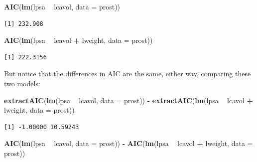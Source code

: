 \documentclass[]{book}
\newenvironment{Shaded}{\begin{snugshade}}{\end{snugshade}}
\newcommand{\KeywordTok}[1]{\textcolor[rgb]{0.13,0.29,0.53}{\textbf{#1}}}
\newcommand{\DataTypeTok}[1]{\textcolor[rgb]{0.13,0.29,0.53}{#1}}
\newcommand{\StringTok}[1]{\textcolor[rgb]{0.31,0.60,0.02}{#1}}
\newcommand{\OperatorTok}[1]{\textcolor[rgb]{0.81,0.36,0.00}{\textbf{#1}}}
\newcommand{\NormalTok}[1]{#1}
\theoremstyle{definition}
\theoremstyle{definition}
\theoremstyle{definition}
\theoremstyle{remark}
\begin{document}
\begin{Shaded}
\begin{Highlighting}[]
\KeywordTok{AIC}\NormalTok{(}\KeywordTok{lm}\NormalTok{(lpsa }\OperatorTok{~}\StringTok{ }\NormalTok{lcavol, }\DataTypeTok{data =}\NormalTok{ prost))}
\end{Highlighting}
\end{Shaded}

\begin{verbatim}
[1] 232.908
\end{verbatim}

\begin{Shaded}
\begin{Highlighting}[]
\KeywordTok{AIC}\NormalTok{(}\KeywordTok{lm}\NormalTok{(lpsa }\OperatorTok{~}\StringTok{ }\NormalTok{lcavol }\OperatorTok{+}\StringTok{ }\NormalTok{lweight, }\DataTypeTok{data =}\NormalTok{ prost))}
\end{Highlighting}
\end{Shaded}

\begin{verbatim}
[1] 222.3156
\end{verbatim}

But notice that the differences in AIC are the same, either way,
comparing these two models:

\begin{Shaded}
\begin{Highlighting}[]
\KeywordTok{extractAIC}\NormalTok{(}\KeywordTok{lm}\NormalTok{(lpsa }\OperatorTok{~}\StringTok{ }\NormalTok{lcavol, }\DataTypeTok{data =}\NormalTok{ prost)) }\OperatorTok{-}\StringTok{ }\KeywordTok{extractAIC}\NormalTok{(}\KeywordTok{lm}\NormalTok{(lpsa }\OperatorTok{~}\StringTok{ }\NormalTok{lcavol }\OperatorTok{+}\StringTok{ }\NormalTok{lweight, }\DataTypeTok{data =}\NormalTok{ prost))}
\end{Highlighting}
\end{Shaded}

\begin{verbatim}
[1] -1.00000 10.59243
\end{verbatim}

\begin{Shaded}
\begin{Highlighting}[]
\KeywordTok{AIC}\NormalTok{(}\KeywordTok{lm}\NormalTok{(lpsa }\OperatorTok{~}\StringTok{ }\NormalTok{lcavol, }\DataTypeTok{data =}\NormalTok{ prost)) }\OperatorTok{-}\StringTok{ }\KeywordTok{AIC}\NormalTok{(}\KeywordTok{lm}\NormalTok{(lpsa }\OperatorTok{~}\StringTok{ }\NormalTok{lcavol }\OperatorTok{+}\StringTok{ }\NormalTok{lweight, }\DataTypeTok{data =}\NormalTok{ prost))}
\end{Highlighting}
\end{Shaded}
\end{document}
